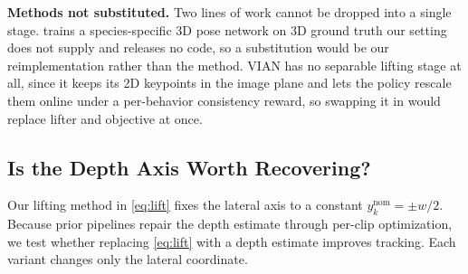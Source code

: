 \documentclass[letterpaper, 10 pt, conference]{ieeeconf}
\newcommand{\aref}[1]{~\hyperref[#1]{App.~\ref*{#1}}}
\newcommand{\aref}[1]{}
\begin{document}




\textbf{Methods not substituted.}
Two lines of work cannot be dropped into a single stage. \cite{zhao2025learning} trains a species-specific 3D pose network on 3D ground truth our setting does not supply and releases no code, so a substitution would be our reimplementation rather than the method. VIAN \cite{yao2022imitation} has no separable lifting stage at all, since it keeps its 2D keypoints in the image plane and lets the policy rescale them online under a per-behavior consistency reward, so swapping it in would replace lifter and objective at once.




\subsection{Is the Depth Axis Worth Recovering?}\label{subsec:exp-minimal}
\noindent
Our lifting method in \autoref{eq:lift} fixes the lateral axis to a constant $y_k^{\mathrm{nom}}{=}{\pm}w/2$.
Because prior pipelines repair the depth estimate through per-clip optimization, we test whether replacing \autoref{eq:lift} with a depth estimate improves tracking. Each variant changes only the lateral coordinate.
\end{document}
